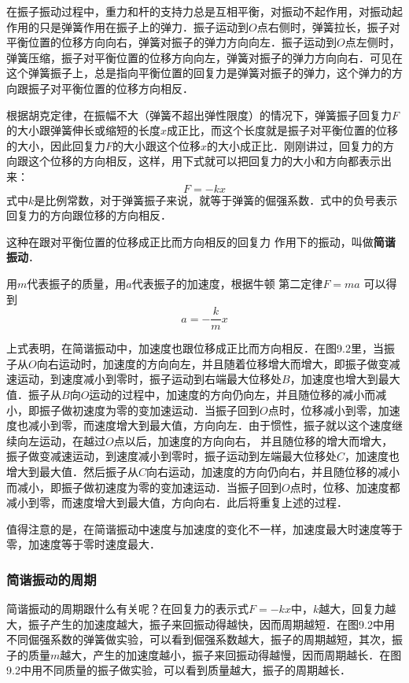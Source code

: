在振子振动过程中，重力和杆的支持力总是互相平衡，对振动不起作用，对振动起作用的只是弹簧作用在振子上的弹力．振子运动到$O$点右侧时，弹簧拉长，振子对平衡位置的位移方向向右，弹簧对振子的弹力方向向左．振子运动到$O$点左侧时，弹簧压缩，振子对平衡位置的位移方向向左，弹簧对振子的弹力方向向右．可见在这个弹簧振子上，总是指向平衡位置的回复力是弹簧对振子的弹力，这个弹力的方向跟振子对平衡位置的位移方向相反．

根据胡克定律，在振幅不大（弹簧不超出弹性限度）的情况下，弹簧振子回复力$F$的大小跟弹簧伸长或缩短的长度$x$成正比，而这个长度就是振子对平衡位置的位移的大小，因此回复力$F$的大小跟这个位移$x$的大小成正比．刚刚讲过，回复力的方向跟这个位移的方向相反，这样，用下式就可以把回复力的大小和方向都表示出来：
\[F=-kx\]
式中$k$是比例常数，对于弹簧振子来说，就等于弹簧的倔强系数．式中的负号表示回复力的方向跟位移的方向相反．

这种在跟对平衡位置的位移成正比而方向相反的回复力
作用下的振动，叫做\textbf{简谐振动}．

用$m$代表振子的质量，用$a$代表振子的加速度，根据牛顿
第二定律$F=ma$ 可以得到
\[a=-\frac{k}{m}x\]

上式表明，在简谐振动中，加速度也跟位移成正比而方向相反．在图9.2里，当振子从$O$向右运动时，加速度的方向向左，并且随着位移增大而增大，即振子做变减速运动，到速度减小到零时，振子运动到右端最大位移处$B$，加速度也增大到最大值．振子从$B$向$O$运动的过程中，加速度的方向仍向左，并且随位移的减小而减小，即振子做初速度为零的变加速运动．当振子回到$O$点时，位移减小到零，加速度也减小到零，而速度增大到最大值，方向向左．由于惯性，振子就以这个速度继续向左运动，在越过$O$点以后，加速度的方向向右，
并且随位移的增大而增大，振子做变减速运动，到速度减小到零时，振子运动到左端最大位移处$C$，加速度也增大到最大值．然后振子从$C$向右运动，加速度的方向仍向右，并且随位移的减小而减小，即振子做初速度为零的变加速运动．当振子回到$O$点时，位移、加速度都减小到零，而速度增大到最大值，方向向右．此后将重复上述的过程．

值得注意的是，在简谐振动中速度与加速度的变化不一样，加速度最大时速度等于零，加速度等于零时速度最大．

\subsubsection{简谐振动的周期}

简谐振动的周期跟什么有关呢？在回复力的表示式$F=-kx$中，$k$越大，回复力越大，振子产生的加速度越大，振子来回振动得越快，因而周期越短．在图9.2中用不同倔强系数的弹簧做实验，可以看到倔强系数越大，振子的周期越短，其次，振子的质量$m$越大，产生的加速度越小，振子来回振动得越慢，因而周期越长．在图9.2中用不同质量的振子做实验，可以看到质量越大，振子的周期越长．

